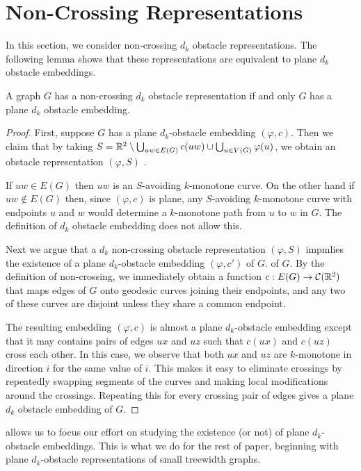 \documentclass{patmorin}
\begin{document}
\section{Non-Crossing Representations}

In this section, we consider non-crossing $d_k$ obstacle
representations. The following lemma shows that these representations
are equivalent to plane $d_k$ obstacle embeddings.

\begin{lem}
   A graph $G$ has a non-crossing $d_k$ obstacle representation if and
   only $G$ has a plane $d_k$ obstacle embedding.
\end{lem}

\begin{proof}
   First, suppose $G$ has a plane $d_k$-obstacle embedding $(\varphi,c)$.
   Then we claim that by taking $S= \mathbb{R}^2\setminus \bigcup_{uw\in E(G)}
   c(uw)\cup \bigcup_{u\in V(G)}\varphi(u)$, we obtain an obstacle
   representation $(\varphi,S)$ .

   If $uw\in E(G)$ then $uw$ is an $S$-avoiding $k$-monotone curve.
   On the other hand if $uw\not\in E(G)$ then, since $(\varphi,c)$
   is plane, any $S$-avoiding $k$-monotone curve with endpoints $u$
   and $w$ would determine a $k$-monotone path from $u$ to $w$ in $G$.
   The definition of $d_k$ obstacle embedding does not allow this.

   Next we argue that a $d_k$ non-crossing obstacle representation
   $(\varphi, S)$ impmlies the existence of a plane $d_k$-obstacle
   embedding $(\varphi, c')$ of $G$.  of $G$.  By the
   definition of non-crossing, we immediately obtain a function
   $c:E(G)\to\mathcal{C}(\mathbb{R}^2)$ that maps edges of $G$ onto geodesic
   curves joining their endpoints, and any two of these curves are
   disjoint unless they share a common endpoint.

   The resulting embedding $(\varphi,c)$ is almost a plane $d_k$-obstacle
   embedding except that it may contains pairs of edges $ux$ and $uz$
   such that $c(ux)$ and $c(uz)$ cross each other.  In this case,
   we observe that both $ux$ and $uz$ are $k$-monotone in direction
   $i$ for the same value of $i$.  This makes it easy to eliminate
   crossings by repeatedly swapping segments of the curves and making
   local modifications around the crossings.  Repeating this for every
   crossing pair of edges gives a plane $d_k$ obstacle embedding of $G$.
\end{proof}

 allows us to focus our effort on studying the existence
(or not) of plane $d_k$-obstacle embeddings.  This is what we do for
the rest of paper, beginning with plane $d_k$-obstacle representations
of small treewidth graphs.
\end{document}
